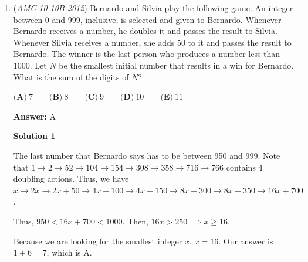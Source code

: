 \begin{enumerate}
\textbf{Solution 3 (Coordinate Bash)}

Let $D=(0,0)$.We know these points from the problem statement:$C=(6,0), B=(6,30), A=(0,30), G=(0,15), E=(8,30)$

 We can use the Shoelace Formula to find the area of quadrilateral $BFDG$. We know the coordinates of all of the points in $BFDG$ except $F$. Since $F$ is the intersection of $\overline{ED}$ and $\overline{BC}$, we can use a system of equations to solve for the coordinates of $F$. The line for $\overline{BC}$ is simply $x = 6$. The line for $\overline{ED}$ passes through the origin so it has a y-intercept of $0$, and a slope of $\frac{30-0}{8-0}=\frac{30}{8}=\frac{15}{4}$. Therefore, the line for $\overline{ED}$ is $y=\frac{15}{4} x$. Substituting $6$ for $x$, we find that $y = \frac{45}{2}$. Therefore, $F=(6, \frac{45}{2})$. Applying Shoelace on these points gives us that $[BFDG] = \boxed{\frac{135}{2}}$.

 


	\item (\textit{AMC 10 10B 2012}) Bernardo and Silvia play the following game. An integer between 0 and 999, inclusive, is selected and given to Bernardo. Whenever Bernardo receives a number, he doubles it and passes the result to Silvia. Whenever Silvia receives a number, she adds 50 to it and passes the result to Bernardo. The winner is the last person who produces a number less than 1000. Let $N$ be the smallest initial number that results in a win for Bernardo. What is the sum of the digits of $N$?


 $\textbf{(A)}\ 7\qquad\textbf{(B)}\ 8\qquad\textbf{(C)}\ 9\qquad\textbf{(D)}\ 10\qquad\textbf{(E)}\ 11$

 \textbf{Answer: }A



\textbf{Solution 1}

The last number that Bernardo says has to be between 950 and 999. Note that $1\rightarrow 2\rightarrow 52\rightarrow 104\rightarrow 154\rightarrow 308\rightarrow 358\rightarrow 716\rightarrow 766$ contains 4 doubling actions. Thus, we have $x \rightarrow 2x \rightarrow 2x+50 \rightarrow 4x+100 \rightarrow 4x+150 \rightarrow 8x+300 \rightarrow 8x+350 \rightarrow 16x+700$. 

 Thus, $950<16x+700<1000$. Then, $16x>250 \implies x \geq 16$. 

 Because we are looking for the smallest integer $x$, $x=16$. Our answer is $1+6=\boxed{7}$, which is A.


\end{enumerate}
